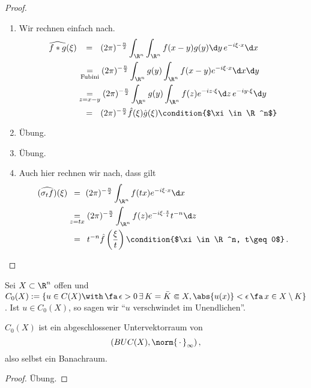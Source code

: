 \begin{proof}
  \begin{enumerate}[\rm(a)]
  \item Wir rechnen einfach nach.
    \begin{align*}
      \widehat{f\ast g} (\xi)
      & \ \ \,  = \, \, \, \, (2\pi)^{-\frac n2}\int_{\R^n}\int_{\R^n}f(x-y)g(y)\d y \,  e^{-i\xi\cdot x}\d x\\
      &\, \underset{\scriptsize\text{Fubini}}=(2\pi)^{-\frac n2}\int_{\R^n}g(y)\int_{\R^n}f(x-y)e^{-i\xi\cdot x}\d x\d y\\
      &\underset{z=x-y}=(2\pi)^{-\frac n2}\int_{\R^n}g(y)\int_{\R^n}f(z)e^{-iz\cdot\xi}\d z \, e^{-iy\cdot\xi}\d y \\
      &\ \ \,  = \, \, \, \,  (2\pi)^{-\frac n2}\hat f(\xi)\hat g(\xi)
      \condition{$\xi\in\R^n$}
    \end{align*}
    \item Übung.
    \item Übung.
    \item Auch hier rechnen wir nach, dass gilt
      \begin{align*}
        (\widehat{\sigma_tf})(\xi) &\, \  = \text{ } (2\pi)^{-\frac n2}\int_{\R^n}f(tx)e^{-i\xi\cdot x}\d x\\
     &   \underset{z=tx}=(2\pi)^{-\frac n2}\int_{\R^n}f(z)e^{-i\xi\cdot\frac zt}t^{-n}\d z \\
       &\ \,  =\, \, \, t^{-n}\hat f\left(\frac \xi t\right)
        \condition{$\xi\in\R^n, t\geq0$} \, . \qedhere
      \end{align*}
  \end{enumerate}
\end{proof}

\begin{defi}
  Sei $X\subset\R^n$ offen und $C_0(X):=\{u\in C(X)\with\,  \fa\,  \epsilon>0\, \exists \,  K=\bar K\Subset X, \abs{u(x)}<\epsilon\, \fa\, x\in X\setminus K\}$. Ist $u\in C_0(X)$, so sagen wir "`$u$ verschwindet im Unendlichen"'.
\end{defi}

\begin{bem}
  \label{bem:8.2}
  $C_0(X)$ ist ein abgeschlossener Untervektorraum von 
  \[ (BUC(X), \norm{\, \cdot\, }_\infty)\, ,\] also selbst ein Banachraum.
\end{bem}

\begin{proof}
  Übung.
\end{proof}

